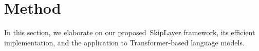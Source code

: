 \documentclass{article}
\newcommand{\skipl}{SkipLayer\xspace}
\begin{document}

\section{Method}
In this section, we elaborate on our proposed~\skipl framework, its efficient implementation, and the application to Transformer-based language models.
\end{document}
